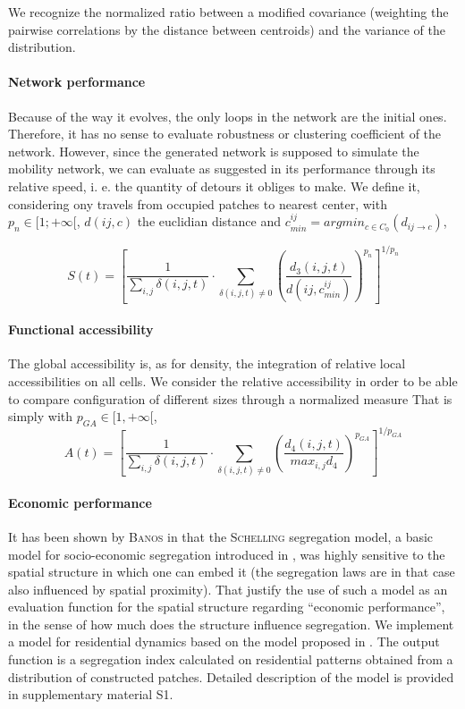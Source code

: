 \documentclass[a4paper,twocolumn,twoside,10pt]{article}
\newcommand{\noun}[1]{\textsc{#1}}
\begin{document}
We recognize the normalized ratio between a modified covariance (weighting
the pairwise correlations by the distance between centroids) and the
variance of the distribution.


\paragraph{Network performance}

Because of the way it evolves, the only loops in the network are the
initial ones. Therefore, it has no sense to evaluate robustness or
clustering coefficient of the network. However, since the generated
network is supposed to simulate the mobility network, we can evaluate
as suggested in \cite{banos2012towards} its performance through its
relative speed, i. e. the quantity of detours it obliges to make.
We define it, considering ony travels from occupied patches to nearest
center, with $p_{n}\in[1;+\infty[$, $d(ij,c)$ the euclidian distance
and $c_{min}^{ij}=argmin_{c\in C_{0}}(d_{ij\rightarrow c})$,

\[
S(t)=\left[\frac{1}{\sum_{i,j}\delta(i,j,t)}\cdot\sum_{\delta(i,j,t)\neq0}\left(\frac{d_{3}(i,j,t)}{d(ij,c_{min}^{ij})}\right)^{p_{n}}\right]^{1/p_{n}}
\]



\paragraph{Functional accessibility}

The global accessibility is, as for density, the integration of relative
local accessibilities on all cells. We consider the relative accessibility
in order to be able to compare configuration of different sizes through
a normalized measure That is simply with $p_{GA}\in[1,+\infty[$,
\[
A(t)=\left[\frac{1}{\sum_{i,j}\delta(i,j,t)}\cdot\sum_{\delta(i,j,t)\neq0}\left(\frac{d_{4}(i,j,t)}{max_{i,j}d_{4}}\right)^{p_{GA}}\right]^{1/p_{GA}}
\]



\paragraph{Economic performance}

It has been shown by \noun{Banos} in \cite{banos2012network} that
the \noun{Schelling} segregation model, a basic model for socio-economic
segregation introduced in \cite{schelling1969models}, was highly
sensitive to the spatial structure in which one can embed it (the
segregation laws are in that case also influenced by spatial proximity).
That justify the use of such a model as an evaluation function for
the spatial structure regarding ``economic performance'', in the
sense of how much does the structure influence segregation. We implement
a model for residential dynamics based on the model proposed in \cite{benenson1998multi}.
The output function is a segregation index calculated on residential
patterns obtained from a distribution of constructed patches. Detailed
description of the model is provided in supplementary material S1.
\end{document}
